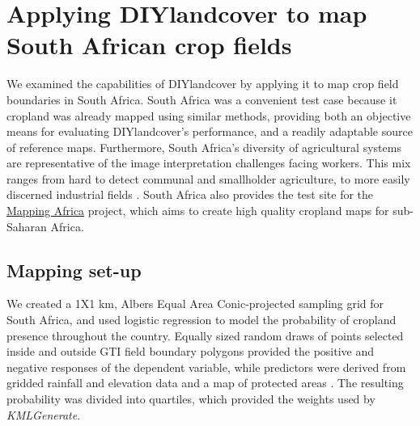 \documentclass[preprint,12pt,authoryear]{elsarticle}
\begin{document}
\section{Applying DIYlandcover to map South African crop fields}
We examined the capabilities of DIYlandcover by applying it to map crop field boundaries in South Africa. South Africa was a convenient test case because it cropland was already mapped \citep[see section 2;][]{geoterraimage_south_2008} using similar methods, providing both an objective means for evaluating DIYlandcover's performance, and a readily adaptable source of reference maps. Furthermore, South Africa's diversity of agricultural systems are representative of the image interpretation challenges facing workers. This mix ranges from hard to detect communal and smallholder agriculture, to more easily discerned industrial fields \citep{hardy_rainfed_2011}. South Africa also provides the test site for the \href{http://mappingafrica.princeton.edu}{Mapping Africa} project, which aims to create high quality cropland maps for sub-Saharan Africa. 

\subsection{Mapping set-up}
We created a 1X1 km, Albers Equal Area Conic-projected sampling grid for South Africa, and used logistic regression to model the probability of cropland presence throughout the country. Equally sized random draws of points selected inside and outside GTI field boundary polygons provided the positive and negative responses of the dependent variable, while predictors were derived from gridded rainfall and elevation data and a map of protected areas \citep[for further details on these variables see][]{estes_comparing_2013,estes_using_2014}. The resulting probability was divided into quartiles, which provided the weights used by \emph{KMLGenerate}.
\end{document}
